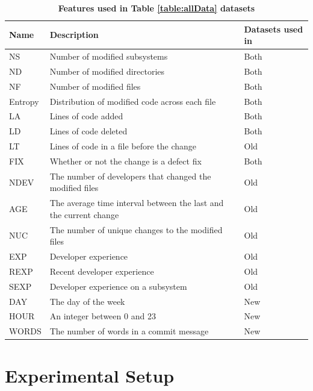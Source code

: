 \documentclass[../main.tex]{subfiles}
\begin{document}
\begin{table}[H]
    \centering
     \caption{\textbf{Features used in Table \ref{table:allData} datasets}}
   \begin{tabular}{|p{15mm} |p{85mm} |p{30mm} |} 
        \hline
        \textbf{Name} & \textbf{Description} & \textbf{Datasets used in}\\ 
        \hline\hline
        NS & Number of modified subsystems & Both\\
        \hline
        ND & Number of modified directories & Both\\
        \hline
        NF & Number of modified files & Both\\
        \hline
        Entropy & Distribution of modified code across each file & Both\\
        \hline
        LA & Lines of code added& Both\\
        \hline
        LD & Lines of code deleted & Both\\
        \hline
        LT & Lines of code in a file before the change & Old \\
        \hline
        FIX & Whether or not the change is a defect fix & Both\\
        \hline
        NDEV & The number of developers that changed the modified files & Old \\
        \hline
        AGE & The average time interval between the last and the current change & Old\\
        \hline
        NUC & The number of unique changes to the modified files & Old\\
        \hline
        EXP & Developer experience & Old \\
        \hline
        REXP & Recent developer experience & Old \\
        \hline
        SEXP & Developer experience on a subsystem & Old \\
        \hline
        DAY & The day of the week & New\\
        \hline
        HOUR & An integer between 0 and 23 & New\\
        \hline
        WORDS & The number of words in a commit message & New\\
        \hline

\end{tabular}
    \label{table:Features}
\end{table}

\section{Experimental Setup}
\end{document}
